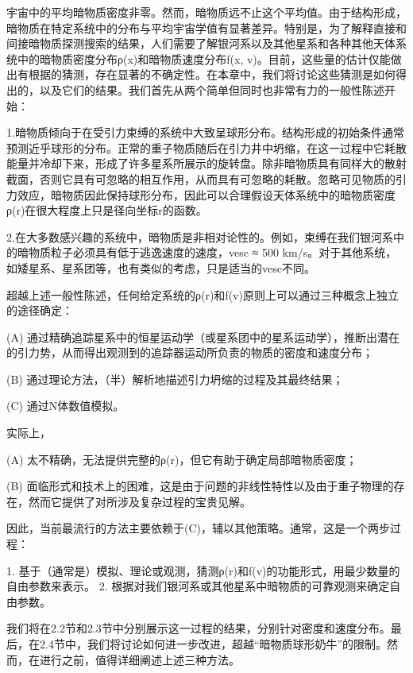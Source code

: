 


宇宙中的平均暗物质密度非零。然而，暗物质远不止这个平均值。由于结构形成，暗物质在特定系统中的分布与平均宇宙学值有显著差异。特别是，为了解释直接和间接暗物质探测搜索的结果，人们需要了解银河系以及其他星系和各种其他天体系统中的暗物质密度分布ρ(x)和暗物质速度分布f(x, v)。目前，这些量的估计仅能做出有根据的猜测，存在显著的不确定性。在本章中，我们将讨论这些猜测是如何得出的，以及它们的结果。我们首先从两个简单但同时也非常有力的一般性陈述开始：

1.暗物质倾向于在受引力束缚的系统中大致呈球形分布。结构形成的初始条件通常预测近乎球形的分布。正常的重子物质随后在引力井中坍缩，在这一过程中它耗散能量并冷却下来，形成了许多星系所展示的旋转盘。除非暗物质具有同样大的散射截面，否则它具有可忽略的相互作用，从而具有可忽略的耗散。忽略可见物质的引力效应，暗物质因此保持球形分布，因此可以合理假设天体系统中的暗物质密度ρ(r)在很大程度上只是径向坐标r的函数。

2.在大多数感兴趣的系统中，暗物质是非相对论性的。例如，束缚在我们银河系中的暗物质粒子必须具有低于逃逸速度的速度，vesc ≈ 500 km/s。对于其他系统，如矮星系、星系团等，也有类似的考虑，只是适当的vesc不同。

超越上述一般性陈述，任何给定系统的ρ(r)和f(v)原则上可以通过三种概念上独立的途径确定：

(A) 通过精确追踪星系中的恒星运动学（或星系团中的星系运动学），推断出潜在的引力势，从而得出观测到的追踪器运动所负责的物质的密度和速度分布；

(B) 通过理论方法，（半）解析地描述引力坍缩的过程及其最终结果；

(C) 通过N体数值模拟。

实际上，

(A) 太不精确，无法提供完整的ρ(r)，但它有助于确定局部暗物质密度；

(B) 面临形式和技术上的困难，这是由于问题的非线性特性以及由于重子物理的存在，然而它提供了对所涉及复杂过程的宝贵见解。

因此，当前最流行的方法主要依赖于(C)，辅以其他策略。通常，这是一个两步过程：

1. 基于（通常是）模拟、理论或观测，猜测ρ(r)和f(v)的功能形式，用最少数量的自由参数来表示。
2. 根据对我们银河系或其他星系中暗物质的可靠观测来确定自由参数。

我们将在2.2节和2.3节中分别展示这一过程的结果，分别针对密度和速度分布。最后，在2.4节中，我们将讨论如何进一步改进，超越“暗物质球形奶牛”的限制。然而，在进行之前，值得详细阐述上述三种方法。

